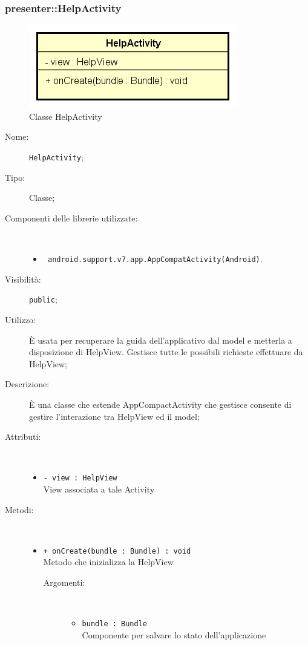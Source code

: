 \documentclass[../DefinizioneDiProdotto.tex]{subfiles}
\begin{document}
\subsubsection{presenter::HelpActivity}

    \begin{figure}[H]
        \centering
        \includegraphics{img/HelpActivity.png}
        \caption{Classe HelpActivity}\label{fig:presenter::HelpActivity} 
    \end{figure}
    \begin{description}
\item[Nome:] \texttt{HelpActivity};
\item[Tipo:] Classe;
\item[Componenti delle librerie utilizzate:] \
\begin{itemize}
\item \texttt{ android.support.v7.app.AppCompatActivity(Android)}.

\end{itemize}
\item[Visibilità:] \texttt{public};
\item[Utilizzo:] È usata per recuperare la guida dell'applicativo dal model e metterla a disposizione di HelpView. Gestisce tutte le possibili richieste effettuare da HelpView;
\item[Descrizione:] È una classe che estende AppCompactActivity che gestisce consente di gestire l'interazione tra HelpView ed il model;
\item[Attributi:] \
\begin{itemize}
\item \texttt{- view : HelpView}\\
View associata a tale Activity

\end{itemize}
\item[Metodi:] \
\begin{itemize}
\item \texttt{+ onCreate(bundle : Bundle) : void}\\
Metodo che inizializza la HelpView
 \begin{description}
\item[Argomenti:] \
\begin{itemize}
\item \texttt{bundle : Bundle}\\
Componente per salvare lo stato dell'applicazione\end{itemize}
\end{description}
\end{itemize}
\end{description}
\end{document}
